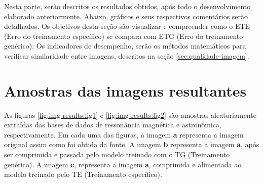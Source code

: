 Nesta parte, serão descritos os resultados obtidos, após todo o desenvolvimento elaborado anteriormente. Abaixo, gráficos e seus respectivos comentários serão detalhados. Os objetivos desta seção são visualizar e compreender como o ETE (Erro do treinamento específico) se compara com ETG (Erro do treinamento genérico). Os indicadores de desempenho, serão os métodos matemáticos para verificar similaridade entre imagens, descritos na seção \ref{sec:qualidade-imagem}. 

\section{Amostras das imagens resultantes}
\label{sec:amostra-img-resultante}

As figuras \ref{fig:img-results:fig1} e \ref{fig:img-results:fig2} são amostras aleatoriamente extraídas das bases de dados de ressonância magnética e astronômica, respectivamente. Em cada uma das figuras, a imagem \textbf{a} representa a imagem original assim como foi obtida da fonte. A imagem \textbf{b} representa a imagem \textbf{a}, após ser comprimida e passada pelo modelo treinado com o TG (Treinamento genérico). A imagem \textbf{c}, representa a imagem \textbf{a}, comprimida e alimentada ao modelo treinado pelo TE (Treinamento específico).


